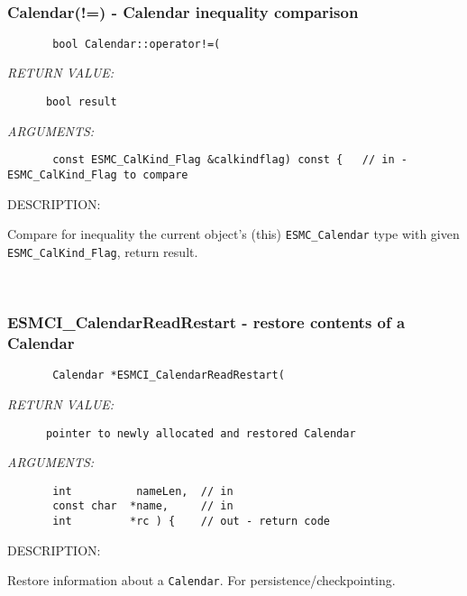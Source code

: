  
\mbox{}\hrulefill\ 
 
\subsubsection [Calendar(!=)] {Calendar(!=) - Calendar inequality comparison}


  
\begin{verbatim}       bool Calendar::operator!=(\end{verbatim}{\em RETURN VALUE:}
\begin{verbatim}      bool result\end{verbatim}{\em ARGUMENTS:}
\begin{verbatim}       const ESMC_CalKind_Flag &calkindflag) const {   // in - ESMC_CalKind_Flag to compare\end{verbatim}
{\sf DESCRIPTION:\\ }


        Compare for inequality the current object's (this) {\tt ESMC\_Calendar}
        type with given {\tt ESMC\_CalKind\_Flag}, return result.
   
 
\mbox{}\hrulefill\ 
 
\subsubsection [ESMCI\_CalendarReadRestart] {ESMCI\_CalendarReadRestart - restore contents of a Calendar }


  
\begin{verbatim}       Calendar *ESMCI_CalendarReadRestart(\end{verbatim}{\em RETURN VALUE:}
\begin{verbatim}      pointer to newly allocated and restored Calendar\end{verbatim}{\em ARGUMENTS:}
\begin{verbatim}       int          nameLen,  // in
       const char  *name,     // in
       int         *rc ) {    // out - return code
 \end{verbatim}
{\sf DESCRIPTION:\\ }


        Restore information about a {\tt Calendar}. 
        For persistence/checkpointing.
   
